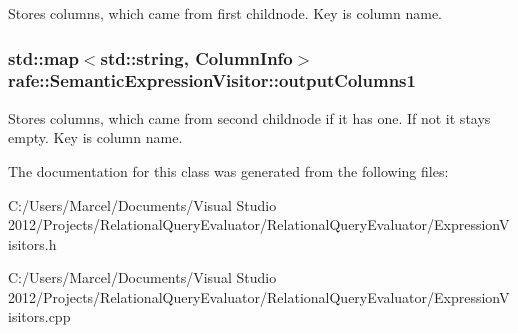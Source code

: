 Stores columns, which came from first childnode. Key is column name. \hypertarget{classrafe_1_1_semantic_expression_visitor_ac36701c0aab42b76a14bfba6c5355b6c}{
\subsubsection[{output\+Columns1}]{\setlength{\rightskip}{0pt plus 5cm}std\+::map$<$std\+::string, {\bf Column\+Info}$>$ rafe\+::\+Semantic\+Expression\+Visitor\+::output\+Columns1}}\label{classrafe_1_1_semantic_expression_visitor_ac36701c0aab42b76a14bfba6c5355b6c}
Stores columns, which came from second childnode if it has one. If not it stays empty. Key is column name. 

The documentation for this class was generated from the following files\+:\begin{DoxyCompactItemize}
\item 
C\+:/\+Users/\+Marcel/\+Documents/\+Visual Studio 2012/\+Projects/\+Relational\+Query\+Evaluator/\+Relational\+Query\+Evaluator/Expression\+Visitors.\+h\item 
C\+:/\+Users/\+Marcel/\+Documents/\+Visual Studio 2012/\+Projects/\+Relational\+Query\+Evaluator/\+Relational\+Query\+Evaluator/Expression\+Visitors.\+cpp\end{DoxyCompactItemize}
